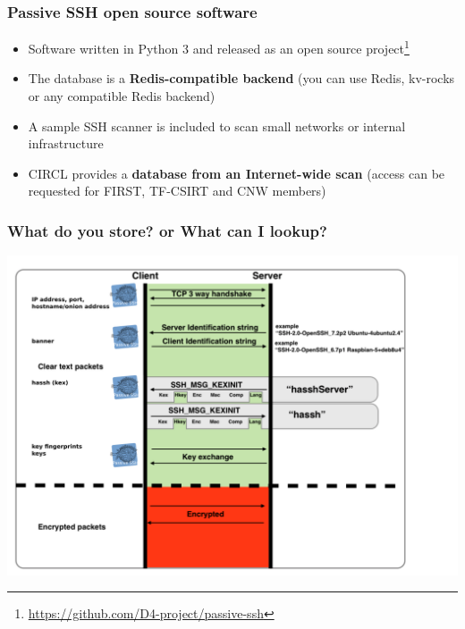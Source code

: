 \documentclass{beamer}
\begin{document}
\begin{frame}
        \frametitle{Passive SSH open source software}
        \begin{itemize}
                \item Software written in Python 3 and released as an open source project\footnote{\url{https://github.com/D4-project/passive-ssh}}
                \item The database is a {\bf Redis-compatible backend} (you can use Redis, kv-rocks or any compatible Redis backend)
                \item A sample SSH scanner is included to scan small networks or internal infrastructure
                \item CIRCL provides a {\bf database from an Internet-wide scan} (access can be requested for FIRST, TF-CSIRT and CNW members)
        \end{itemize}
\end{frame}

\begin{frame}
        \frametitle{What do you store? or What can I lookup?}
        \includegraphics[scale=0.3]{sshhandshake.png}
\end{frame}
\end{document}
